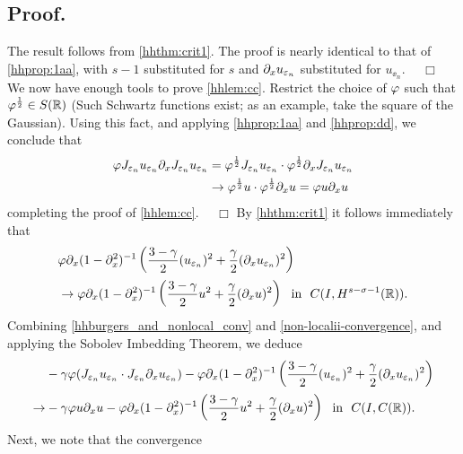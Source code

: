 \subsection{Proof.} The result follows from \cref{hhthm:crit1}.
The proof is nearly identical to that of
\cref{hhprop:1aa}, with $s-1$ substituted for $s$
and $\partial_x u_{\varepsilon_n}$ substituted for $u_{\ee_n}$. $\quad \Box$
%
%
We now have enough tools to prove \cref{hhlem:cc}. Restrict the
choice of $\varphi$ such that $\varphi^\frac{1}{2} \in S(\mathbb{R})$
(Such Schwartz functions exist; as an example, take the square
of the Gaussian). Using this fact, and applying \cref{hhprop:1aa} and \cref{hhprop:dd}, we conclude that
\begin{equation*}
\begin{split}
\varphi J_{\varepsilon_n} u_{\varepsilon_n} \partial_x J_{\varepsilon_n} u_{\varepsilon_n} 
& = \varphi^\frac{1}{2} J_{\varepsilon_n} u_{\varepsilon_n} \cdot
\varphi^\frac{1}{2} \partial_x J_{\varepsilon_n} u_{\varepsilon_n}
\\
& \to \varphi^\frac{1}{2} u \cdot \varphi^\frac{1}{2} \partial_x u = \varphi
u \partial_x u
\end{split}
\end{equation*}
completing the proof of \cref{hhlem:cc}. $\quad \Box$
%
%
%
%
By \cref{hhthm:crit1} it follows immediately that
\begin{equation}
\begin{split}
& \varphi \partial_x(1- \partial_x^2)^{-1} \left( \frac{3-\gamma}{2}
(u_{\varepsilon_n})^2
+ \frac{\gamma}{2} (\partial_x u_{\varepsilon_n})^2 \right )
\\
& \to
\varphi \partial_x(1- \partial_x^2)^{-1} \left( \frac{3-\gamma}{2} u^2
+ \frac{\gamma}{2} (\partial_x u)^2 \right ) \ \
\text{in} \ \ C(I, H^{s-\sigma-1}(\mathbb{R})).
\label{non-localii-convergence}
\end{split}
\end{equation}
Combining \eqref{hhburgers_and_nonlocal_conv} and
\eqref{non-localii-convergence}, and applying the Sobolev Imbedding
Theorem, we deduce 
\begin{equation}
\begin{split}
& -\gamma \varphi (J_{\varepsilon_n} u_{\varepsilon_n} \cdot J_{\varepsilon_n} \partial_x
u_{\varepsilon_n}) -
\varphi \partial_x(1- \partial_x^2)^{-1} \left( \frac{3-\gamma}{2}
(u_{\varepsilon_n})^2
+ \frac{\gamma}{2} (\partial_x u_{\varepsilon_n})^2 \right )
\\
\to & -\gamma \varphi u \partial_x u -
\varphi \partial_x(1- \partial_x^2)^{-1} \left( \frac{3-\gamma}{2} u^2
+ \frac{\gamma}{2} (\partial_x u)^2 \right ) \ \
\text{in} \ \ C(I, C(\mathbb{R})).
\label{llloc-non-loc-tog}
\end{split}
\end{equation}
%
Next, we note that the convergence  
